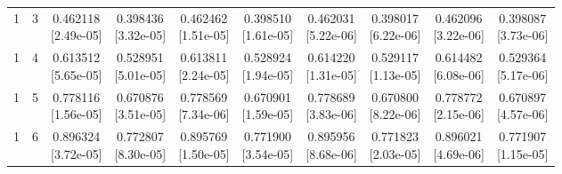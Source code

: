 \documentclass[12pt,letterpaper]{article}
\theoremstyle{plain}
\theoremstyle{definition}
\begin{document}
\begin{table}[p]
\begin{adjustbox}{max width=\linewidth}
\begin{tabular}{@{}rr*{8}{c}@{}}
1 & 3 & \shortstack{0.462118\\[-1pt]{\scriptsize[2.49e-05]}} & \shortstack{0.398436\\[-1pt]{\scriptsize[3.32e-05]}} & \shortstack{0.462462\\[-1pt]{\scriptsize[1.51e-05]}} & \shortstack{0.398510\\[-1pt]{\scriptsize[1.61e-05]}} & \shortstack{0.462031\\[-1pt]{\scriptsize[5.22e-06]}} & \shortstack{0.398017\\[-1pt]{\scriptsize[6.22e-06]}} & \shortstack{0.462096\\[-1pt]{\scriptsize[3.22e-06]}} & \shortstack{0.398087\\[-1pt]{\scriptsize[3.73e-06]}}\\
1 & 4 & \shortstack{0.613512\\[-1pt]{\scriptsize[5.65e-05]}} & \shortstack{0.528951\\[-1pt]{\scriptsize[5.01e-05]}} & \shortstack{0.613811\\[-1pt]{\scriptsize[2.24e-05]}} & \shortstack{0.528924\\[-1pt]{\scriptsize[1.94e-05]}} & \shortstack{0.614220\\[-1pt]{\scriptsize[1.31e-05]}} & \shortstack{0.529117\\[-1pt]{\scriptsize[1.13e-05]}} & \shortstack{0.614482\\[-1pt]{\scriptsize[6.08e-06]}} & \shortstack{0.529364\\[-1pt]{\scriptsize[5.17e-06]}}\\
1 & 5 & \shortstack{0.778116\\[-1pt]{\scriptsize[1.56e-05]}} & \shortstack{0.670876\\[-1pt]{\scriptsize[3.51e-05]}} & \shortstack{0.778569\\[-1pt]{\scriptsize[7.34e-06]}} & \shortstack{0.670901\\[-1pt]{\scriptsize[1.59e-05]}} & \shortstack{0.778689\\[-1pt]{\scriptsize[3.83e-06]}} & \shortstack{0.670800\\[-1pt]{\scriptsize[8.22e-06]}} & \shortstack{0.778772\\[-1pt]{\scriptsize[2.15e-06]}} & \shortstack{0.670897\\[-1pt]{\scriptsize[4.57e-06]}}\\
1 & 6 & \shortstack{0.896324\\[-1pt]{\scriptsize[3.72e-05]}} & \shortstack{0.772807\\[-1pt]{\scriptsize[8.30e-05]}} & \shortstack{0.895769\\[-1pt]{\scriptsize[1.50e-05]}} & \shortstack{0.771900\\[-1pt]{\scriptsize[3.54e-05]}} & \shortstack{0.895956\\[-1pt]{\scriptsize[8.68e-06]}} & \shortstack{0.771823\\[-1pt]{\scriptsize[2.03e-05]}} & \shortstack{0.896021\\[-1pt]{\scriptsize[4.69e-06]}} & \shortstack{0.771907\\[-1pt]{\scriptsize[1.15e-05]}}\\

\end{tabular}
\end{adjustbox}
\end{table}
\end{document}
